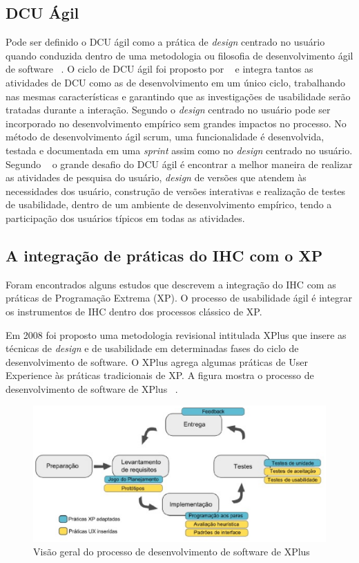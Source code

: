 \subsection{DCU Ágil}

Pode ser definido o DCU ágil como a prática de \emph{design} centrado no usuário quando conduzida dentro de uma metodologia ou filosofia de desenvolvimento ágil de software ~\cite{santos2012}. 
%
O ciclo de DCU ágil foi proposto por ~ e integra tantos as atividades de DCU como as de desenvolvimento em um único ciclo, trabalhando nas mesmas características e garantindo que as investigações de usabilidade serão tratadas durante a interação.
%
Segundo  o \emph{design} centrado no usuário pode ser incorporado no desenvolvimento empírico sem grandes impactos no processo. No método de desenvolvimento ágil scrum, uma funcionalidade é desenvolvida, testada e documentada em uma \textit{sprint} assim como no \emph{design} centrado no usuário. 
%	
Segundo ~ o grande desafio do DCU ágil é encontrar a melhor maneira de realizar as atividades de pesquisa do usuário, \emph{design} de versões que atendem às necessidades dos usuário, construção de versões interativas e realização de testes de usabilidade, dentro de um ambiente de desenvolvimento empírico, tendo a participação dos usuários típicos em todas as atividades.

\subsection{A integração de práticas do IHC com o XP}

Foram encontrados alguns estudos que descrevem a integração do IHC com as práticas de Programação Extrema (XP). O processo de usabilidade ágil é integrar os instrumentos de IHC dentro dos processos clássico de XP. 

%
Em 2008 foi proposto uma metodologia revisional intitulada XPlus que insere as técnicas de \emph{design} e de usabilidade em determinadas fases do ciclo de desenvolvimento de software. O XPlus agrega algumas práticas de User Experience às práticas tradicionais de XP. A figura mostra o processo de desenvolvimento de software de XPlus ~\cite{guimaraesxplus}.

\begin{figure}[h]
    \centering
    \includegraphics[keepaspectratio=true,scale=0.60]
      {figuras/xplus.eps}
    \caption{Visão geral do processo de desenvolvimento de software de XPlus}
    \label{ciclo_xplus}
\end{figure}



